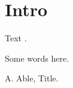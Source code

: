 \documentclass{article}
\begin{document}
\tableofcontents
\section{Intro}
Text \cite{a}.

Some words here.
\begin{enumerate}
 A. Able, Title.
\end{enumerate}
\end{document}
